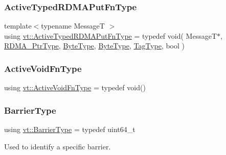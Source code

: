 \mbox{\label{namespacevt_a881ee9bd1e4e71905da1f563ee26ce25}} 
\subsubsection{\texorpdfstring{Active\+Typed\+R\+D\+M\+A\+Put\+Fn\+Type}{ActiveTypedRDMAPutFnType}}
{\footnotesize\ttfamily template$<$typename MessageT $>$ \\
using \hyperlink{namespacevt_a881ee9bd1e4e71905da1f563ee26ce25}{vt\+::\+Active\+Typed\+R\+D\+M\+A\+Put\+Fn\+Type} = typedef void( MessageT$\ast$, \hyperlink{namespacevt_a9e2c953286c7616f7c218e9951790776}{R\+D\+M\+A\+\_\+\+Ptr\+Type}, \hyperlink{namespacevt_aab8d55968084610ce3b17057981e9300}{Byte\+Type}, \hyperlink{namespacevt_aab8d55968084610ce3b17057981e9300}{Byte\+Type}, \hyperlink{namespacevt_a84ab281dae04a52a4b243d6bf62d0e52}{Tag\+Type}, bool )}

\mbox{\label{namespacevt_ad0569ad32e87f0c5fb53fccd669f8dfa}} 
\subsubsection{\texorpdfstring{Active\+Void\+Fn\+Type}{ActiveVoidFnType}}
{\footnotesize\ttfamily using \hyperlink{namespacevt_ad0569ad32e87f0c5fb53fccd669f8dfa}{vt\+::\+Active\+Void\+Fn\+Type} = typedef void()}

\mbox{\label{namespacevt_a25e481f0d6bbc7204db23d1c87a62e77}} 
\subsubsection{\texorpdfstring{Barrier\+Type}{BarrierType}}
{\footnotesize\ttfamily using \hyperlink{namespacevt_a25e481f0d6bbc7204db23d1c87a62e77}{vt\+::\+Barrier\+Type} = typedef uint64\+\_\+t}



Used to identify a specific barrier. 

\mbox{\label{namespacevt_ac34f95a5e2b8109b55bfba52b074443d}} 
